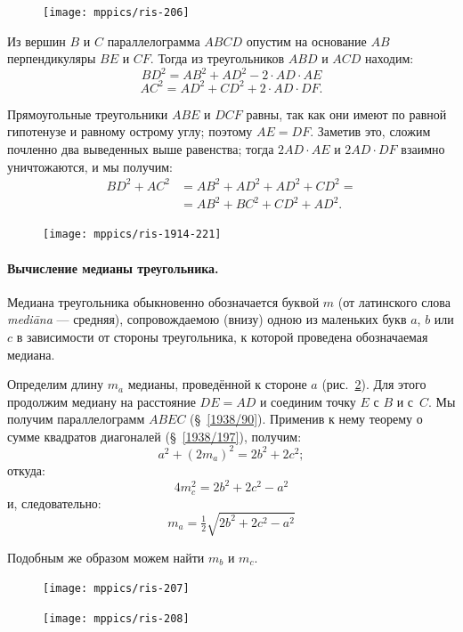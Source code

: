 \documentclass[twoside]{book}
\begin{document}
\begin{figure}
\centering
\texttt{[image: mppics/ris-206]}
\caption{}\label{1938/ris-206}
\end{figure}

Из вершин $B$ и $C$ параллелограмма $ABCD$ опустим на основание $AB$ перпендикуляры $BE$ и $CF$.
Тогда из треугольников $ABD$ и $ACD$ находим:
\[BD^2=AB^2+AD^2-2\cdot AD\cdot AE\]
\[AC^2=AD^2+CD^2+2\cdot AD\cdot  DF.\]

{\sloppy

Прямоугольные треугольники $ABE$ и $DCF$ равны, так как они имеют по равной гипотенузе и равному острому углу;
поэтому $AE=DF$.
Заметив это, сложим почленно два выведенных выше равенства;
тогда $2AD\cdot  AE$ и $2AD\cdot  DF$ взаимно уничтожаются, и мы получим:
\begin{align*}
BD^2+AC^2&=AB^2+AD^2+AD^2+CD^2=
\\
&=AB^2+BC^2+CD^2+AD^2.
\end{align*}

}

\begin{figure}
\centering
\texttt{[image: mppics/ris-1914-221]}
\caption{}\label{1914/ris-221}
\end{figure}

\paragraph{Вычисление медианы треугольника.}\label{1914/241}
Медиана треугольника обыкновенно обозначается буквой $m$ (от латинского слова \emph{mediāna} --- средняя), сопровождаемою (внизу) одною из маленьких букв $a$, $b$ или $c$ в зависимости от стороны треугольника, к которой проведена обозначаемая медиана.

Определим длину $m_a$ медианы, проведённой к стороне $a$ (рис.~\ref{1914/ris-221}).
Для этого продолжим медиану на расстояние $DE=AD$ и соединим точку $E$ с $B$ и с~$C$.
Мы получим параллелограмм $ABEC$ (§~\ref{1938/90}).
Применив к нему теорему о сумме квадратов диагоналей (§~\ref{1938/197}), получим:
\[a^2+(2m_a)^2=2b^2+2c^2;\]
откуда: 
\[4m_c^2=2b^2+2c^2-a^2\]
и, следовательно:
\[m_a=\tfrac 12\sqrt{2b^2+2c^2-a^2}\]

Подобным же образом можем найти $m_b$ и $m_c$.

\begin{figure}[h!]
\begin{minipage}{.48\textwidth}
\centering
\texttt{[image: mppics/ris-207]}
\end{minipage}
\hfill
\begin{minipage}{.48\textwidth}
\centering
\texttt{[image: mppics/ris-208]}
\end{minipage}

\medskip

\begin{minipage}{.48\textwidth}
\centering
\caption{}\label{1938/ris-207}
\end{minipage}
\hfill
\begin{minipage}{.48\textwidth}
\centering
\caption{}\label{1938/ris-208}
\end{minipage}
\vskip-4mm
\end{figure}
\end{document}
